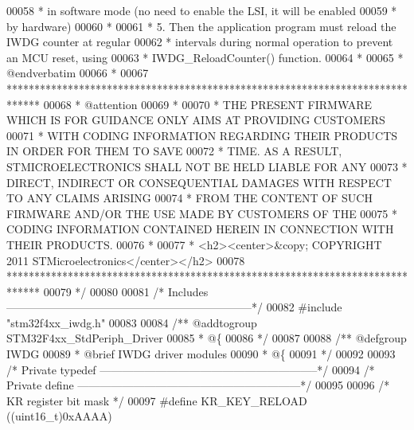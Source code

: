 \begin{DoxyCode}
00058 \textcolor{comment}{  *             in software mode (no need to enable the LSI, it will be enabled}
00059 \textcolor{comment}{  *             by hardware)}
00060 \textcolor{comment}{  *             }
00061 \textcolor{comment}{  *          5. Then the application program must reload the IWDG counter at regular}
00062 \textcolor{comment}{  *             intervals during normal operation to prevent an MCU reset, using}
00063 \textcolor{comment}{  *             IWDG\_ReloadCounter() function.      }
00064 \textcolor{comment}{  *          }
00065 \textcolor{comment}{  *  @endverbatim}
00066 \textcolor{comment}{  *    }
00067 \textcolor{comment}{  ******************************************************************************}
00068 \textcolor{comment}{  * @attention}
00069 \textcolor{comment}{  *}
00070 \textcolor{comment}{  * THE PRESENT FIRMWARE WHICH IS FOR GUIDANCE ONLY AIMS AT PROVIDING CUSTOMERS}
00071 \textcolor{comment}{  * WITH CODING INFORMATION REGARDING THEIR PRODUCTS IN ORDER FOR THEM TO SAVE}
00072 \textcolor{comment}{  * TIME. AS A RESULT, STMICROELECTRONICS SHALL NOT BE HELD LIABLE FOR ANY}
00073 \textcolor{comment}{  * DIRECT, INDIRECT OR CONSEQUENTIAL DAMAGES WITH RESPECT TO ANY CLAIMS ARISING}
00074 \textcolor{comment}{  * FROM THE CONTENT OF SUCH FIRMWARE AND/OR THE USE MADE BY CUSTOMERS OF THE}
00075 \textcolor{comment}{  * CODING INFORMATION CONTAINED HEREIN IN CONNECTION WITH THEIR PRODUCTS.}
00076 \textcolor{comment}{  *}
00077 \textcolor{comment}{  * <h2><center>&copy; COPYRIGHT 2011 STMicroelectronics</center></h2>}
00078 \textcolor{comment}{  ******************************************************************************}
00079 \textcolor{comment}{  */}
00080 
00081 \textcolor{comment}{/* Includes ------------------------------------------------------------------*/}
00082 \textcolor{preprocessor}{#}\textcolor{preprocessor}{include} "stm32f4xx_iwdg.h"
00083 
00084 \textcolor{comment}{/** @addtogroup STM32F4xx\_StdPeriph\_Driver}
00085 \textcolor{comment}{  * @\{}
00086 \textcolor{comment}{  */}
00087 
00088 \textcolor{comment}{/** @defgroup IWDG }
00089 \textcolor{comment}{  * @brief IWDG driver modules}
00090 \textcolor{comment}{  * @\{}
00091 \textcolor{comment}{  */}
00092 
00093 \textcolor{comment}{/* Private typedef -----------------------------------------------------------*/}
00094 \textcolor{comment}{/* Private define ------------------------------------------------------------*/}
00095 
00096 \textcolor{comment}{/* KR register bit mask */}
00097 \textcolor{preprocessor}{#}\textcolor{preprocessor}{define} \textcolor{preprocessor}{KR\_KEY\_RELOAD}    \textcolor{preprocessor}{(}\textcolor{preprocessor}{(}\textcolor{preprocessor}{uint16\_t}\textcolor{preprocessor}{)}0xAAAA\textcolor{preprocessor}{)}

\end{DoxyCode}
